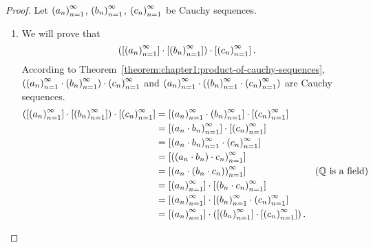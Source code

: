 \begin{proof}
    Let ${\left({a_{n}}\right)}^{\infty}_{n=1}$, ${\left({b_{n}}\right)}^{\infty}_{n=1}$, ${\left({c_{n}}\right)}^{\infty}_{n=1}$ be Cauchy sequences.
    \begin{enumerate}[label={(F\arabic*)},itemsep=0pt,topsep=0pt,start=5]
        \item We will prove that
              \[
                  \left(\left[{{\left({a_{n}}\right)}^{\infty}_{n=1}}\right]\cdot\left[{{\left({b_{n}}\right)}^{\infty}_{n=1}}\right]\right)\cdot\left[{{\left({c_{n}}\right)}^{\infty}_{n=1}}\right].
              \]
              According to Theorem~\ref{theorem:chapter1:product-of-cauchy-sequences}, $\left({\left({a_{n}}\right)}^{\infty}_{n=1}\cdot{\left({b_{n}}\right)}^{\infty}_{n=1}\right)\cdot{\left({c_{n}}\right)}^{\infty}_{n=1}$ and ${\left({a_{n}}\right)}^{\infty}_{n=1}\cdot\left({\left({b_{n}}\right)}^{\infty}_{n=1}\cdot{\left({c_{n}}\right)}^{\infty}_{n=1}\right)$ are Cauchy sequences.
              \begin{align*}
                  \left(\class{\seq{a_{n}}}\cdot\class{\seq{b_{n}}}\right)\cdot\class{\seq{c_{n}}} & = \class{\seq{a_{n}}\cdot\seq{b_{n}}}\cdot\class{\seq{c_{n}}}                                                          \\
                                                                                                   & = \class{\seq{a_{n}\cdot b_{n}}}\cdot\class{\seq{c_{n}}}                                                               \\
                                                                                                   & = \class{\seq{a_{n}\cdot b_{n}}\cdot\seq{c_{n}}}                                                                       \\
                                                                                                   & = \class{\seq{(a_{n}\cdot b_{n})\cdot c_{n}}}                                                                          \\
                                                                                                   & = \class{\seq{a_{n}\cdot(b_{n}\cdot c_{n})}}                                        & \text{($\mathbb{Q}$ is a field)} \\
                                                                                                   & = \class{\seq{a_{n}}}\cdot\class{\seq{b_{n}\cdot c_{n}}}                                                               \\
                                                                                                   & = \class{\seq{a_{n}}}\cdot\class{\seq{b_{n}}\cdot\seq{c_{n}}}                                                          \\
                                                                                                   & = \class{\seq{a_{n}}}\cdot\left(\class{\seq{b_{n}}}\cdot\class{\seq{c_{n}}}\right).

\end{align*}
\end{enumerate}
\end{proof}
